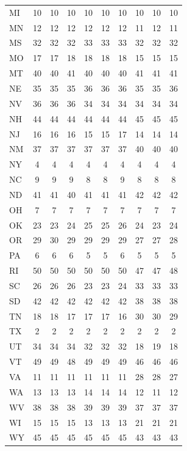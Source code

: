 \documentclass{article}
\begin{document}
\begin{table}[H]
\begin{tabular}{l*{9}{c}}
MI & 10 & 10 & 10 & 10 & 10 & 10 & 10 & 10 & 10 \\
MN & 12 & 12 & 12 & 12 & 12 & 12 & 11 & 12 & 11 \\
MS & 32 & 32 & 32 & 33 & 33 & 33 & 32 & 32 & 32 \\
MO & 17 & 17 & 18 & 18 & 18 & 18 & 15 & 15 & 15 \\
MT & 40 & 40 & 41 & 40 & 40 & 40 & 41 & 41 & 41 \\
NE & 35 & 35 & 35 & 36 & 36 & 36 & 35 & 35 & 36 \\
NV & 36 & 36 & 36 & 34 & 34 & 34 & 34 & 34 & 34 \\
NH & 44 & 44 & 44 & 44 & 44 & 44 & 45 & 45 & 45 \\
NJ & 16 & 16 & 16 & 15 & 15 & 17 & 14 & 14 & 14 \\
NM & 37 & 37 & 37 & 37 & 37 & 37 & 40 & 40 & 40 \\
NY & 4 & 4 & 4 & 4 & 4 & 4 & 4 & 4 & 4 \\
NC & 9 & 9 & 9 & 8 & 8 & 9 & 8 & 8 & 8 \\
ND & 41 & 41 & 40 & 41 & 41 & 41 & 42 & 42 & 42 \\
OH & 7 & 7 & 7 & 7 & 7 & 7 & 7 & 7 & 7 \\
OK & 23 & 23 & 24 & 25 & 25 & 26 & 24 & 23 & 24 \\
OR & 29 & 30 & 29 & 29 & 29 & 29 & 27 & 27 & 28 \\
PA & 6 & 6 & 6 & 5 & 5 & 6 & 5 & 5 & 5 \\
RI & 50 & 50 & 50 & 50 & 50 & 50 & 47 & 47 & 48 \\
SC & 26 & 26 & 26 & 23 & 23 & 24 & 33 & 33 & 33 \\
SD & 42 & 42 & 42 & 42 & 42 & 42 & 38 & 38 & 38 \\
TN & 18 & 18 & 17 & 17 & 17 & 16 & 30 & 30 & 29 \\
TX & 2 & 2 & 2 & 2 & 2 & 2 & 2 & 2 & 2 \\
UT & 34 & 34 & 34 & 32 & 32 & 32 & 18 & 19 & 18 \\
VT & 49 & 49 & 48 & 49 & 49 & 49 & 46 & 46 & 46 \\
VA & 11 & 11 & 11 & 11 & 11 & 11 & 28 & 28 & 27 \\
WA & 13 & 13 & 13 & 14 & 14 & 14 & 12 & 11 & 12 \\
WV & 38 & 38 & 38 & 39 & 39 & 39 & 37 & 37 & 37 \\
WI & 15 & 15 & 15 & 13 & 13 & 13 & 21 & 21 & 21 \\
WY & 45 & 45 & 45 & 45 & 45 & 45 & 43 & 43 & 43 \\
\bottomrule
\end{tabular}
\end{table}
\end{document}
